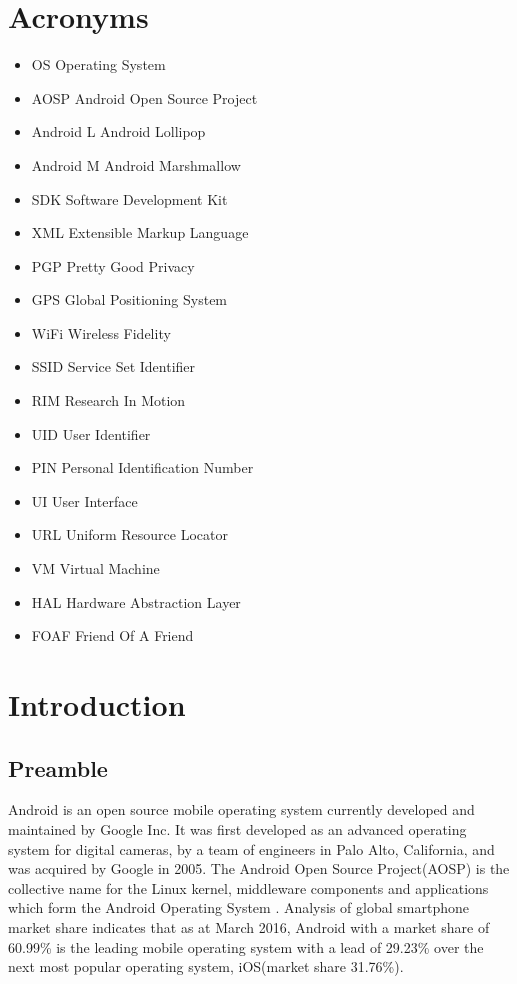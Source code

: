 
\chapter*{Acronyms}
\begin{itemize}
\item[] OS \tab \tab Operating System
\item[] AOSP \tab \tab Android Open Source Project
\item[] Android L \tab Android Lollipop
\item[] Android M \tab Android Marshmallow
\item[] SDK \tab \tab Software Development Kit
\item[] XML \tab \tab Extensible Markup Language
\item[] PGP \tab \tab Pretty Good Privacy
\item[] GPS \tab \tab Global Positioning System
\item[] WiFi \tab \tab Wireless Fidelity
\item[] SSID \tab \tab Service Set Identifier
\item[] RIM \tab \tab Research In Motion
\item[] UID \tab \tab User Identifier
\item[] PIN \tab \tab Personal Identification Number
\item[] UI \tab \tab User Interface
\item[] URL \tab \tab Uniform Resource Locator
\item[] VM \tab \tab Virtual Machine
\item[] HAL \tab \tab Hardware Abstraction Layer
\item[] FOAF \tab \tab Friend Of A Friend
\end{itemize}

\chapter{Introduction} \label{cha:intro}
\section{Preamble}

Android is an open source mobile operating system currently developed and maintained by Google Inc. It was first developed as an advanced operating system for digital cameras, by a team of engineers in Palo Alto, California, and was acquired by Google in 2005. The Android Open Source Project(AOSP) is the collective name for the Linux kernel, middleware components and  applications which form the Android Operating System \cite{a}. Analysis of global smartphone market share indicates that as at March 2016, Android with a market share of 60.99\% is the leading mobile operating system with a lead of 29.23\% over the next most popular operating system, iOS(market share 31.76\%)\cite{b}.
\smallskip

